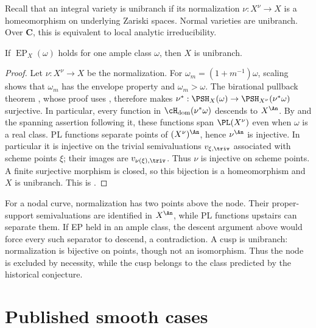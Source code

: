Recall that an integral variety is unibranch if its normalization
$\nu:X^\nu\to X$ is a homeomorphism on underlying Zariski spaces.
Normal varieties are unibranch.  Over $\mathbf C$, this is equivalent to
local analytic irreducibility.

\begin{theorem}\label{thm:ep-implies-unibranch}
If $\operatorname{EP}_X(\omega)$ holds for one ample class
$\omega$, then $X$ is unibranch.
\end{theorem}

\begin{proof}
Let $\nu:X^\nu\to X$ be the normalization.  For
$\omega_m=(1+m^{-1})\omega$, scaling shows that $\omega_m$ has the
envelope property and $\omega_m>\omega$.  The birational pullback theorem
\cite[Lemma~5.13]{BJ22}, whose proof uses
, therefore makes
$\nu^*:\PSH_X(\omega)\to\PSH_{X^\nu}(\nu^*\omega)$ surjective.  In
particular, every function in
$\cH_{\mathrm{dom}}(\nu^*\omega)$ descends to $X^{\An}$.  By  and the spanning assertion following it,
these functions span $\PL(X^\nu)$ even when $\omega$ is a real class.
PL functions separate points of $(X^\nu)^{\An}$, hence $\nu^{\An}$ is
injective. In particular it is injective on the trivial semivaluations
$v_{\xi,\triv}$ associated with scheme points $\xi$; their images are
$v_{\nu(\xi),\triv}$. Thus $\nu$ is injective on scheme points. A finite
surjective morphism is closed, so this bijection is a homeomorphism and
$X$ is unibranch.  This is
\cite[Theorem~5.12]{BJ22}.
\end{proof}

\begin{example}
\label{ex:node-cusp-envelope}
For a nodal curve, normalization has two points above the node.  Their
proper-support semivaluations are identified in $X^{\An}$, while PL
functions upstairs can separate them.  If EP held in an ample class, the
descent argument above would force every such separator to descend, a
contradiction.  A cusp is unibranch: normalization is bijective on points,
though not an isomorphism.  Thus the node is excluded by necessity, while
the cusp belongs to the class predicted by the historical conjecture.
\end{example}

\section{Published smooth cases}

